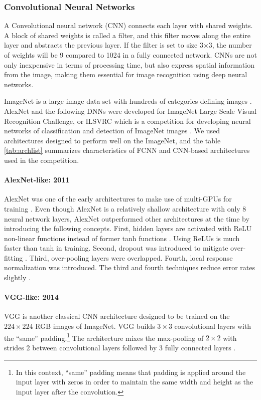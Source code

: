 \subsubsection{Convolutional Neural Networks}
\label{subsubsect:CNN}
A Convolutional neural network (CNN) connects each layer with shared weights. 
A block of shared weights is called a filter, and this filter moves along the entire layer and abstracts the previous layer. 
If the filter is set to size 3$\times$3, the number of weights will be 9 compared to 1024 in a fully connected network. 
CNNs are not only inexpensive in terms of processing time, but also express spatial information from the image, making them essential for image recognition using deep neural networks.

ImageNet is a large image data set with hundreds of categories defining images \citep{2009imagenet_cvpr09}.
AlexNet and the following DNNs were developed for ImageNet Large Scale Visual Recognition Challenge, or ILSVRC which is a competition for developing neural networks of classification and detection of ImageNet images \citep{2014arXiv1409.0575R}.
We used architectures designed to perform well on the ImageNet, and the table \ref{tab:archlist} summarizes characteristics of FCNN and CNN-based architectures used in the competition.

\paragraph{AlexNet-like: 2011}
\label{paragraph:AlexNet}
AlexNet was one of the early architectures to make use of multi-GPUs for training \citep{NIPS2012_c399862d}.
Even though AlexNet is a relatively shallow architecture with only 8 neural network layers, AlexNet outperformed other architectures at the time by introducing the following concepts.
First, hidden layers are activated with ReLU non-linear functions instead of former tanh functions \citep{2018arxivAgarap}.
Using ReLUs is much faster than tanh in training.
Second, dropout was introduced to mitigate over-fitting \citep{srivastava2014dropout}.
Third, over-pooling layers were overlapped.
Fourth, local response normalization was introduced.
The third and fourth techniques reduce error rates slightly \citep{2017arxivWang}.

\paragraph{VGG-like: 2014}
\label{paragraph:VGG}
VGG is another classical CNN architecture designed to be trained on the $224\times224$ RGB images of ImageNet. 
VGG builds $3\times3$ convolutional layers with the ``same'' padding.\footnote{In this context, ``same'' padding means that padding is applied around the input layer with zeros in order to maintain the same width and height as the input layer after the convolution.}
The architecture mixes the max-pooling of $2\times2$ with strides 2 between convolutional layers followed by 3 fully connected layers \citep{2014arxivGraham}.

